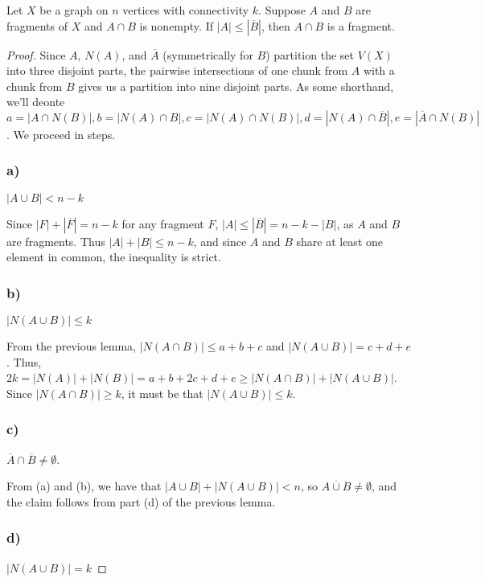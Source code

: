 \begin{theorem}
	
	
	Let $X$ be a graph on $n$ vertices with connectivity $k$.  Suppose $A$ and $B$ are fragments of $X$ and $A\cap B$ is nonempty.  If $|A|\leq |\overline{B}|$, then $A\cap B$ is a fragment.
	
	
\end{theorem}
\begin{proof}
	
	
	Since $A$, $N(A)$, and $\overline{A}$ (symmetrically for $B$) partition the set $V(X)$ into three disjoint parts, the pairwise intersections of one chunk from $A$ with a chunk from $B$ gives us a partition into nine disjoint parts.  As some shorthand, we'll deonte $$a=|A\cap N(B)|,b=|N(A)\cap B|,c=|N(A)\cap N(B)|,d=|N(A)\cap\overline{B}|,e=|\overline{A}\cap N(B)|$$.  We proceed in steps.
	
	\subsubsection*{a)} $|A\cup B|<n-k$
	
	Since $|F|+|\overline{F}| = n-k$ for any fragment $F$, $|A|\leq |\overline{B}| = n-k-|B|$, as $A$ and $B$ are fragments.  Thus $|A|+|B|\leq n-k$, and since $A$ and $B$ share at least one element in common, the inequality is strict.
	
	\subsubsection*{b)} $|N(A\cup B)|\leq k$
	
	From the previous lemma, $|N(A\cap B)|\leq a+b+c$ and $|N(A\cup B)|=c+d+e$.  Thus, $2k=|N(A)|+|N(B)| = a+b+2c+d+e \geq |N(A\cap B)|+|N(A\cup B)|$.  Since $|N(A\cap B)|\geq k$, it must be that $|N(A\cup B)|\leq k$.
	
	\subsubsection*{c)} $\overline{A}\cap\overline{B}\neq \emptyset$.
	
	
	From (a) and (b), we have that $|A\cup B| + |N(A\cup B)| < n$, so $\overline{A\cup B}\neq \emptyset$, and the claim follows from part (d) of the previous lemma.
	
	\subsubsection*{d)} $|N(A\cup B)|=k$
	

\end{proof}
